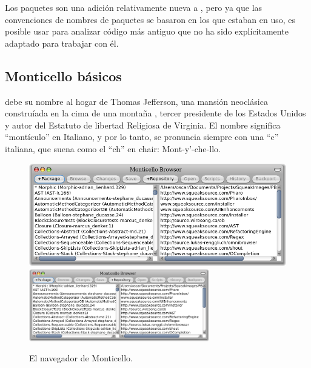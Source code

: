 \documentclass[spanish,a4paper,10pt,twoside]{book}
\begin{document}
Los paquetes son una adici\'on relativamente nueva a \pharo, pero ya que las convenciones de nombres de paquetes se basaron en los que estaban en uso, es posible usar  para analizar c\'odigo m\'as antiguo que no ha sido expl\'icitamente adaptado para trabajar con \'el.


\subsection{Monticello b\'asicos}

 debe su nombre al hogar de Thomas Jefferson, una mansi\'on neocl\'asica constru\'iada en la cima de una monta\~na , tercer presidente de los Estados Unidos y autor del Estatuto de libertad Religiosa de Virginia. El nombre significa ``mont\'iculo'' en Italiano, y por lo tanto, se pronuncia siempre con una ``c'' italiana, que suena como el ``ch'' en chair: Mont-y'-che-llo.


\begin{figure}[btp]
	\begin{center}
	\ifluluelse
		{\includegraphics[width=\textwidth]{freshMonticello}}
		{\includegraphics[width=0.7\textwidth]{freshMonticello}}
	\end{center}
	\caption{El navegador de Monticello.}
\end{figure}
\end{document}
